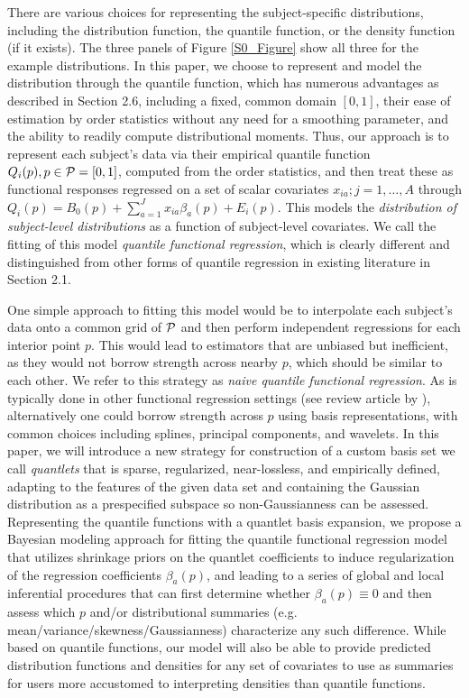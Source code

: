 \documentclass[11pt]{article}
\begin{document}
There are various choices for representing the subject-specific distributions, including the distribution function, the quantile function, or the density function (if it exists).  The three panels of Figure \ref{S0_Figure} show all three for the example distributions.  In this paper, we choose to represent and model the distribution through the quantile function, which has numerous advantages as described in Section 2.6, including a fixed, common domain $[0,1]$, their ease of estimation by order statistics without any need for a smoothing parameter, and the ability to readily compute distributional moments.  Thus, our approach is to represent each subject's data via their empirical quantile function $Q_i(p), p\in {\cal P}= [0,1]$, computed from the order statistics, and then treat these as functional responses regressed on a set of scalar covariates $x_{ia}; j=1,\ldots,A$ through $Q_i(p) = B_0(p) + \sum_{a=1}^J x_{ia} \beta_a(p) + E_i(p)$.  This models the \textit{distribution of subject-level distributions} as a function of subject-level covariates.  We call the fitting of this model \textit{quantile functional regression}, which is clearly
different and distinguished
  from other forms of quantile regression in existing literature in Section 2.1.


One simple approach to fitting this model would be to interpolate each subject's data onto a common grid of ${\cal P}$ and then perform independent regressions for each interior point $p$.  This would lead to estimators that are unbiased but inefficient, as they would not borrow strength across nearby $p$, which should be similar to each other.  We refer to this strategy as \textit{naive quantile functional regression}.   As is typically done in other functional regression settings (see review article by \cite{morris2015functionalreg}), alternatively one could borrow strength across $p$ using basis representations, with common choices including splines, principal components, and wavelets.  In this paper, we will introduce a new strategy for construction of a custom basis set 
we call 
 \textit{quantlets} that is sparse, regularized, near-lossless, %
and empirically defined, adapting to the features of the given data set and containing the Gaussian distribution as a prespecified subspace so non-Gaussianness can be assessed.  Representing the quantile functions with a quantlet basis expansion, we propose a Bayesian modeling approach for fitting the quantile functional regression model that utilizes shrinkage priors on the quantlet coefficients to induce regularization of the regression coefficients $\beta_a(p)$, and leading to a series of global and local inferential procedures that can first determine whether $\beta_a(p)\equiv 0$ and then assess which $p$ and/or distributional summaries (e.g. mean/variance/skewness/Gaussianness) characterize any such difference.  While based on quantile functions, our model will also be able to provide predicted distribution functions and densities for any set of covariates to use as summaries for users more accustomed to interpreting densities than quantile functions.
\end{document}
